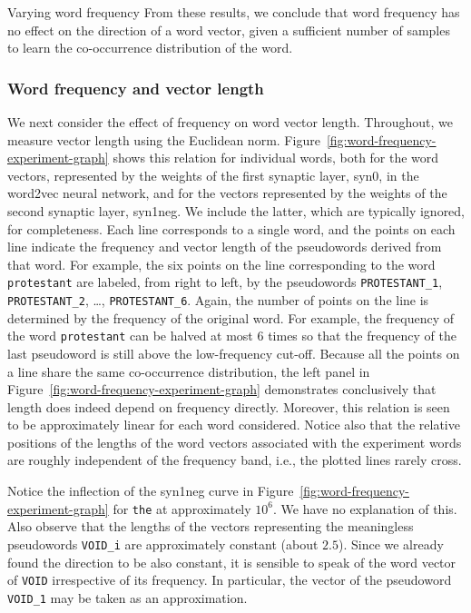 \documentclass{article} %
\newcommand{\word}[1]{\texttt{#1}}
\begin{document}
\begin{section}{Varying word frequency}
From these results, we conclude that word frequency has no effect on the
direction of a word vector, given a sufficient number of samples to
learn the co-occurrence distribution of the word.

\subsubsection{Word frequency and vector length}
We next consider the effect of frequency on word vector length.
Throughout, we measure vector length using the Euclidean norm.
Figure~\ref{fig:word-frequency-experiment-graph} shows this relation for
individual words, both for the word vectors, represented by the weights
of the first synaptic layer, syn0, in the word2vec neural network, and
for the vectors represented by the weights of the second synaptic layer,
syn1neg.  We include the latter, which are typically ignored, for
completeness.  Each line corresponds to a single word, and the points on
each line indicate the frequency and vector length of the pseudowords derived
from that word.  For example, the six points on the line corresponding
to the word \word{protestant} are labeled, from right to left, by the
pseudowords \word{PROTESTANT\_1}, \word{PROTESTANT\_2}, \dots,
\word{PROTESTANT\_6}.  Again, the number of points on the line is
determined by the frequency of the original word.  For example, the
frequency of the word \word{protestant} can be halved at most $6$ times
so that the frequency of the last pseudoword is still above the low-frequency
cut-off.  Because all the points on a line share the same co-occurrence
distribution, the left panel in
Figure~\ref{fig:word-frequency-experiment-graph} demonstrates
conclusively that length does indeed depend on frequency directly.
Moreover, this relation is seen to be approximately linear for each word
considered.  Notice also that the relative positions of the lengths of
the word vectors associated with the experiment words are roughly
independent of the frequency band, i.e., the plotted lines rarely cross.

Notice the inflection of the syn1neg curve in
Figure~\ref{fig:word-frequency-experiment-graph} for \word{the} at
approximately $10^6$.  We have no explanation of this.  Also observe
that the lengths of the vectors representing the meaningless pseudowords
\word{VOID\_i} are approximately constant (about $2.5$).  Since we
already found the direction to be also constant, it is sensible to speak
of the word vector of \word{VOID} irrespective of its frequency.  In
particular, the vector of the pseudoword \word{VOID\_1} may be taken as an approximation.


\end{section}
\end{document}
